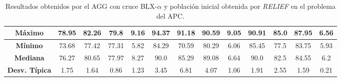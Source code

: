 \documentclass[11pt,a4paper]{article}
\begin{document}
\begin{table}[H]
{\begin{tabular}{c|c|c|c|c|c|c|c|c|c|c|c|c|}
\multicolumn{1}{|c|}{\textbf{Máximo}}       & 78.95             & 82.26                   & 79.8          & 9.16       & 94.37             & 91.18          & 90.59         & 9.05       & 90.91             & 85.0           & 87.95         & 6.56       \\ \hline
\multicolumn{1}{|c|}{\textbf{Mínimo}}       & 73.68             & 77.42                   & 77.31         & 5.82       & 84.29             & 70.59          & 80.29         & 6.06       & 85.45             & 77.5           & 83.75         & 5.93       \\ \hline
\multicolumn{1}{|c|}{\textbf{Mediana}}      & 76.27             & 80.65                   & 77.97         & 8.27       & 90.0              & 85.29          & 89.08         & 6.64       & 90.0              & 82.5           & 84.55         & 6.2        \\ \hline
\multicolumn{1}{|c|}{\textbf{Desv. Típica}} & 1.75              & 1.64                    & 0.86          & 1.23       & 3.45              & 6.81           & 4.07          & 1.06       & 1.91              & 2.55           & 1.59          & 0.21       \\ \hline
\end{tabular}
}%
\caption{Resultados obtenidos por el AGG con cruce BLX-$\alpha$ y población inicial obtenida por \textit{RELIEF} en el problema
del APC.}
\end{table}
\end{document}
